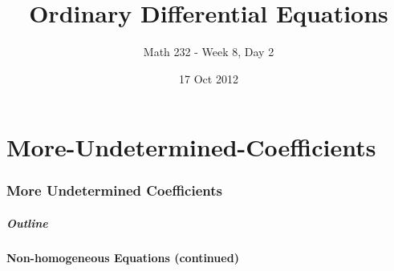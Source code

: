 \part{More-Undetermined-Coefficients}
\section{More Undetermined Coefficients}

\title{Ordinary Differential Equations}
\subtitle{Math 232 - Week 8, Day 2}
\date{17 Oct 2012}

\begin{frame}
  \titlepage
\end{frame}

\begin{frame}
  \frametitle{Outline}
\end{frame}


\subsection{Non-homogeneous Equations (continued)}


